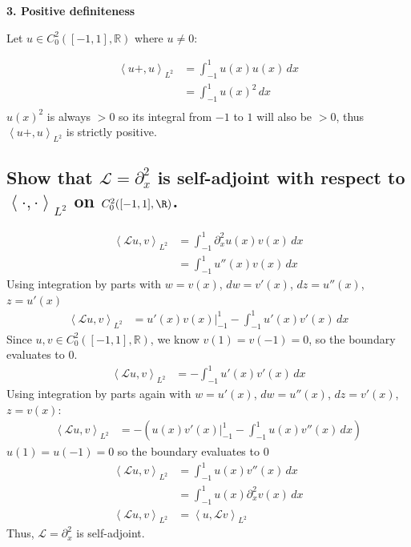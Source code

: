 \documentclass[11pt]{article}
\begin{document}
    \textbf{3. Positive definiteness}

    Let $u \in C_0^2([-1,1],\mathbb R)$ where $u\neq0$:

    \begin{align*}
        \left<u+,u\right>_{L^2} &= \int_{-1}^{1} u(x)u(x) \,dx\\
        &=\int_{-1}^{1} u(x)^2 \,dx\\
    \end{align*}
    $u(x)^2$ is always $> 0$ so its integral from $-1$ to $1$ will also be $>0$, thus $\left<u+,u\right>_{L^2}$
    is strictly positive.

    \subsection{Show that $\mathcal{L}=\partial_x^2$ is self-adjoint with respect to $\left<\cdot, \cdot\right>_{L^2}$
        on $C_0^2([-1,1],\R)$.}


    \begin{align*}
        \left<\mathcal{L}u,v\right>_{L^2} &= \int_{-1}^{1} \partial_x^2 u(x) v(x) \,dx \\
        &= \int_{-1}^{1} u''(x) v(x) \,dx
    \end{align*}
    Using integration by parts with $w=v(x)$, $dw=v'(x)$, $dz=u''(x)$, $z=u'(x)$
    \begin{align*}
        \left<\mathcal{L}u,v\right>_{L^2} &= u'(x)v(x)\Big|_{-1}^{1} - \int_{-1}^{1} u'(x)v'(x) \,dx
    \end{align*}
    Since $u,v \in C_0^2([-1,1],\mathbb{R})$, we know $v(1)=v(-1)=0$, so the boundary evaluates to 0.
    \begin{align*}
        \left<\mathcal{L}u,v\right>_{L^2} &= - \int_{-1}^{1} u'(x)v'(x) \,dx
    \end{align*}
    Using integration by parts again with $w=u'(x)$, $dw=u''(x)$, $dz=v'(x)$, $z=v(x)$:
    \begin{align*}
        \left<\mathcal{L}u,v\right>_{L^2} &= - \left( u(x)v'(x)\Big|_{-1}^{1} - \int_{-1}^{1} u(x)v''(x) \,dx \right)
    \end{align*}
    $u(1)=u(-1)=0$ so the boundary evaluates to 0
    \begin{align*}
        \left<\mathcal{L}u,v\right>_{L^2} &= \int_{-1}^{1} u(x)v''(x) \,dx \\
        &= \int_{-1}^{1} u(x)\partial_x^2v(x) \,dx \\
        \left<\mathcal{L}u,v\right>_{L^2} &= \left<u,\mathcal{L}v\right>_{L^2}
    \end{align*}
    Thus, $\mathcal{L}=\partial_x^2$ is self-adjoint.
\end{document}
